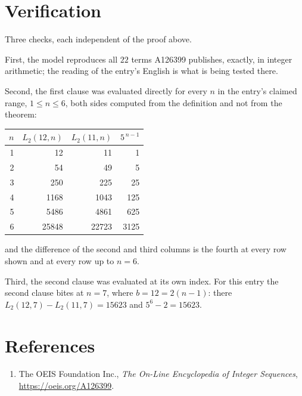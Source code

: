 \documentclass[11pt,a4paper]{article}
\theoremstyle{plain}
\theoremstyle{definition}
\begin{document}
\section{Verification}

Three checks, each independent of the proof above.

First, the model reproduces all $22$ terms A126399 publishes, exactly, in integer
arithmetic; the reading of the entry's English is what is being tested there.

Second, the first clause was evaluated directly for every $n$ in the entry's claimed range,
$1\le n\le6$, both sides computed from the definition and not from the theorem:

\begin{center}
\begin{tabular}{rrrr}
$n$ & $L_{2}(12,n)$ & $L_{2}(11,n)$ & $5^{\,n-1}$ \\ \hline
1 & 12 & 11 & 1 \\
2 & 54 & 49 & 5 \\
3 & 250 & 225 & 25 \\
4 & 1168 & 1043 & 125 \\
5 & 5486 & 4861 & 625 \\
6 & 25848 & 22723 & 3125 \\
\end{tabular}
\end{center}

\noindent and the difference of the second and third columns is the fourth at every row shown
and at every row up to $n=6$.

Third, the second clause was evaluated at its own index. For this entry the second clause bites at $n=7$, where $b=12=2(n-1)$: there $L_{2}(12,7)-L_{2}(11,7)=15623$ and $5^{6}-2=15623$.

\section*{References}
\begin{enumerate}
\item The OEIS Foundation Inc., \emph{The On-Line Encyclopedia of Integer Sequences},
\url{https://oeis.org/A126399}.
\end{enumerate}
\end{document}
